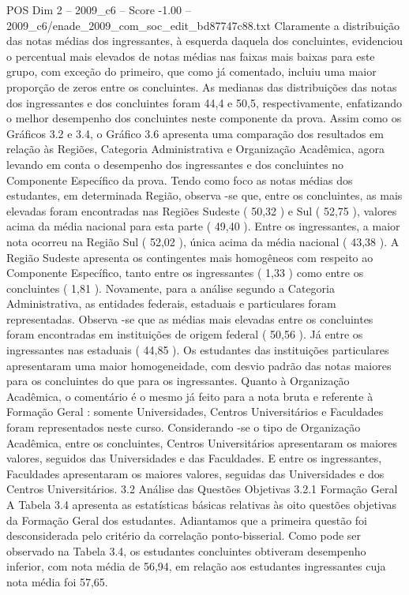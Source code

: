 \begin{textsample}{POS Dim 2 – 2009\_c6 – Score -1.00 – 2009\_c6/enade\_2009\_com\_soc\_edit\_bd87747c88.txt}
Claramente a distribuição das notas médias dos ingressantes, à esquerda daquela dos concluintes, evidenciou o percentual mais elevados de notas médias nas faixas mais baixas para este grupo, com exceção do primeiro, que como já comentado, incluiu uma maior proporção de zeros entre os concluintes.
As medianas das distribuições das notas dos ingressantes e dos concluintes foram 44,4 e 50,5, respectivamente, enfatizando o melhor desempenho dos concluintes neste componente da prova.
Assim como os Gráficos 3.2 e 3.4, o Gráfico 3.6 apresenta uma comparação dos resultados em relação às Regiões, Categoria Administrativa e Organização Acadêmica, agora levando em conta o desempenho dos ingressantes e dos concluintes no Componente Específico da prova.
Tendo como foco as notas médias dos estudantes, em determinada Região, observa -se que, entre os concluintes, as mais elevadas foram encontradas nas Regiões Sudeste ( 50,32 ) e Sul ( 52,75 ), valores acima da média nacional para esta parte ( 49,40 ).
Entre os ingressantes, a maior nota ocorreu na Região Sul ( 52,02 ), única acima da média nacional ( 43,38 ).
A Região Sudeste apresenta os contingentes mais homogêneos com respeito ao Componente Específico, tanto entre os ingressantes ( 1,33 ) como entre os concluintes ( 1,81 ).
Novamente, para a análise segundo a Categoria Administrativa, as entidades federais, estaduais e particulares foram representadas.
Observa -se que as médias mais elevadas entre os concluintes foram encontradas em instituições de origem federal ( 50,56 ).
Já entre os ingressantes nas estaduais ( 44,85 ).
Os estudantes das instituições particulares apresentaram uma maior homogeneidade, com desvio padrão das notas maiores para os concluintes do que para os ingressantes.
Quanto à Organização Acadêmica, o comentário é o mesmo já feito para a nota bruta e referente à Formação Geral : somente Universidades, Centros Universitários e Faculdades foram representados neste curso.
Considerando -se o tipo de Organização Acadêmica, entre os concluintes, Centros Universitários apresentaram os maiores valores, seguidos das Universidades e das Faculdades.
E entre os ingressantes, Faculdades apresentaram os maiores valores, seguidas das Universidades e dos Centros Universitários. 3.2 Análise das Questões Objetivas 3.2.1 Formação Geral A Tabela 3.4 apresenta as estatísticas básicas relativas às oito questões objetivas da Formação Geral dos estudantes.
Adiantamos que a primeira questão foi desconsiderada pelo critério da correlação ponto-bisserial.
Como pode ser observado na Tabela 3.4, os estudantes concluintes obtiveram desempenho inferior, com nota média de 56,94, em relação aos estudantes ingressantes cuja nota média foi 57,65.

\end{textsample}
